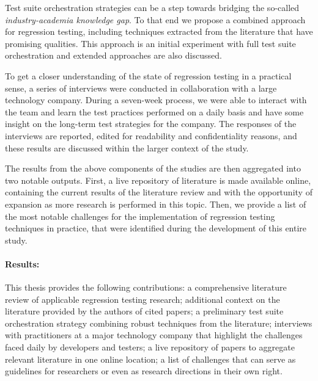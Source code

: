 \documentclass[11pt, a4paper, twoside]{Thesis} %
\begin{document}
Test suite orchestration strategies can be a step towards bridging the so-called \textit{industry-academia knowledge gap}.
To that end we propose a combined approach for regression testing, including techniques extracted from the literature that have promising qualities.
This approach is an initial experiment with full test suite orchestration and extended approaches are also discussed.

To get a closer understanding of the state of regression testing in a practical sense, a series of interviews were conducted in collaboration with a large technology company.
During a seven-week process, we were able to interact with the team and learn the test practices performed on a daily basis and have some insight on the long-term test strategies for the company.
The responses of the interviews are reported, edited for readability and confidentiality reasons, and these results are discussed within the larger context of the study.

The results from the above components of the studies are then aggregated into two notable outputs.
First, a live repository of literature is made available online, containing the current results of the literature review and with the opportunity of expansion as more research is performed in this topic.
Then, we provide a list of the most notable challenges for the implementation of regression testing techniques in practice, that were identified during the development of this entire study.


\paragraph{Results:}
This thesis provides the following contributions:
a comprehensive literature review of applicable regression testing research;
additional context on the literature provided by the authors of cited papers;
a preliminary test suite orchestration strategy combining robust techniques from the literature;
interviews with practitioners at a major technology company that highlight the challenges faced daily by developers and testers;
a live repository of papers to aggregate relevant literature in one online location;
a list of challenges that can serve as guidelines for researchers or even as research directions in their own right.
\end{document}
